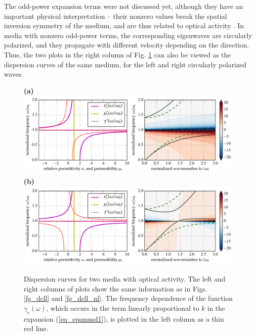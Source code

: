 The odd-power expansion terms were not discussed yet, although they have an important physical interpretation -- their nonzero values break the spatial inversion symmetry of the medium, and are thus related to optical activity \cite{bungay1993equivalency}. 
In media with nonzero odd-power terms, the corresponding eigenwaves are circularly polarized, and they propagate with different velocity depending on the direction. %
Thus, the two plots in the right column of Fig. \ref{fg_dcllactivity} can also be viewed as the dispersion curves of the same medium, for the left and right circularly polarized waves.

\begin{figure}[t] \caption{Dispersion curves for two media with optical activity. The left and right columns of plots show the same information as in Figs. \ref{fg_dcll} and \ref{fg_dcll_nl}. The frequency dependence of the function $\gamma_e(\omega)$, which occurs in the term linearly proportional to $k$ in the expansion (\ref{eq_epsmusd1}), is plotted in the left column as a thin red line. } \label{fg_dcllactivity} \centering  
\textbf{(a)}\\\includegraphics[width=1\textwidth]{img/dispersion_landau_lifshitz/dispersion_ll_activep.pdf}
\textbf{(b)}\\\includegraphics[width=1\textwidth]{img/dispersion_landau_lifshitz/dispersion_ll_activen.pdf}
\end{figure}



